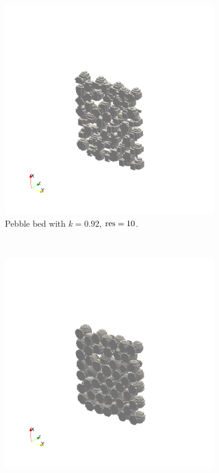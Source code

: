 \begin{figure}[ht]
        \centering
        \begin{subfigure}[b]{0.3\textwidth}
                \includegraphics[width=\textwidth, trim={200pt, 150pt, 200pt, 200pt},clip]{figures/lbm/k092res10}
                \caption{Pebble bed with $k = 0.92$, $\text{res} = 10$.}
                \label{fig:k092res10}
        \end{subfigure}%
        ~
        \begin{subfigure}[b]{0.3\textwidth}
                \includegraphics[width=\textwidth, trim={200pt, 150pt, 200pt, 200pt},clip]{figures/lbm/k0947res20}

\end{subfigure}
\end{figure}
